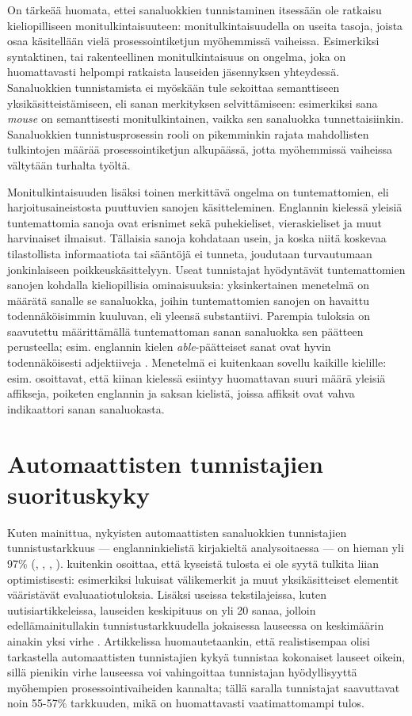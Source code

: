 \documentclass[utf8,bachelor,manualbib]{gradu3}
\begin{document}
On tärkeää huomata, ettei sanaluokkien tunnistaminen itsessään ole ratkaisu kieliopilliseen monitulkintaisuuteen: monitulkintaisuudella on useita tasoja, joista osaa käsitellään vielä prosessointiketjun myöhemmissä vaiheissa. Esimerkiksi syntaktinen, tai rakenteellinen monitulkintaisuus on ongelma, joka on huomattavasti helpompi ratkaista lauseiden jäsennyksen yhteydessä. Sanaluokkien tunnistamista ei myöskään tule sekoittaa semanttiseen yksikäsitteistämiseen, eli sanan merkityksen selvittämiseen: esimerkiksi sana \textit{mouse} on semanttisesti monitulkintainen, vaikka sen sanaluokka tunnettaisiinkin. Sanaluokkien tunnistusprosessin rooli on pikemminkin rajata mahdollisten tulkintojen määrää prosessointiketjun alkupäässä, jotta myöhemmissä vaiheissa vältytään turhalta työltä.

Monitulkintaisuuden lisäksi toinen merkittävä ongelma on tuntemattomien, eli harjoitusaineistosta puuttuvien sanojen käsitteleminen. Englannin kielessä yleisiä tuntemattomia sanoja ovat erisnimet sekä puhekieliset, vieraskieliset ja muut harvinaiset ilmaisut. Tällaisia sanoja kohdataan usein, ja koska niitä koskevaa tilastollista informaatiota tai sääntöjä ei tunneta, joudutaan turvautumaan jonkinlaiseen poikkeuskäsittelyyn. Useat tunnistajat hyödyntävät tuntemattomien sanojen kohdalla kieliopillisia ominaisuuksia: yksinkertainen menetelmä on määrätä sanalle se sanaluokka, joihin tuntemattomien sanojen on havaittu todennäköisimmin kuuluvan, eli yleensä substantiivi. Parempia tuloksia on saavutettu määrittämällä tuntemattoman sanan sanaluokka sen päätteen perusteella; esim. englannin kielen \emph{able}-päätteiset sanat ovat hyvin todennäköisesti adjektiiveja \citep{samuelsson1993}. Menetelmä ei kuitenkaan sovellu kaikille kielille: esim. \citet{tseng2005} osoittavat, että kiinan kielessä esiintyy huomattavan suuri määrä yleisiä affikseja, poiketen englannin ja saksan kielistä, joissa affiksit ovat vahva indikaattori sanan sanaluokasta.


\section{Automaattisten tunnistajien suorituskyky}

Kuten mainittua, nykyisten automaattisten sanaluokkien tunnistajien tunnistustarkkuus --- englanninkielistä kirjakieltä analysoitaessa --- on hieman yli 97\%  (\citealp{toutanova2003}, \citealp{shen2007}, \citealp{spoustova2009}, \citealp{sogaard2010}). \citet{manning2011} kuitenkin osoittaa, että kyseistä tulosta ei ole syytä tulkita liian optimistisesti: esimerkiksi lukuisat välikemerkit ja muut yksikäsitteiset elementit vääristävät evaluaatiotuloksia. Lisäksi useissa tekstilajeissa, kuten uutisiartikkeleissa, lauseiden keskipituus on yli 20 sanaa, jolloin edellämainitullakin tunnistustarkkuudella jokaisessa lauseessa on keskimäärin ainakin yksi virhe \citep{manning1999}. Artikkelissa huomautetaankin, että realistisempaa olisi tarkastella automaattisten tunnistajien kykyä tunnistaa kokonaiset lauseet oikein, sillä pienikin virhe lauseessa voi vahingoittaa tunnistajan hyödyllisyyttä myöhempien prosessointivaiheiden kannalta; tällä saralla tunnistajat saavuttavat noin 55-57\% tarkkuuden, mikä on huomattavasti vaatimattomampi tulos.
\end{document}
